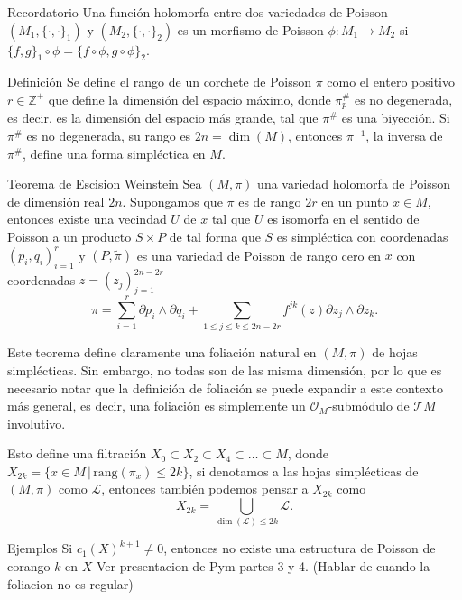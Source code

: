 \documentclass[letterpaper]{beamer}
\newcommand{\zah}{\ensuremath{ \mathbb Z }}
\begin{document}
\begin{frame}
    \begin{block}{Recordatorio}
        Una funci\'on holomorfa entre dos variedades de Poisson $(M_1,\{\cdot,\cdot\}_1)$ y $(M_2,\{\cdot,\cdot\}_2)$ es un morfismo de Poisson
        $\phi:M_1\rightarrow M_2$ si $\{f,g\}_1\circ\phi=\{f\circ\phi,g\circ\phi\}_2$.
    \end{block}
    \begin{block}{Definici\'on}
      Se define el rango de un corchete de Poisson $\pi$ como el entero positivo $r\in \zah^{+}$ que define la dimensi\'on del
      espacio m\'aximo, donde $\pi^{\#}_p$ es no degenerada, es decir, es la dimensi\'on del espacio m\'as grande, tal que $\pi^{\#}$ es una
      biyecci\'on. Si $\pi^{\#}$ es no degenerada, su rango es $2n=\dim(M)$, entonces $\pi^{-1}$, la inversa de $\pi^{\#}$, define una forma simpl\'ectica
      en $M$.
    \end{block}
\end{frame}

\begin{frame}
\begin{block}{Teorema de Escision Weinstein}\label{weins}
        Sea $(M,\pi)$ una variedad holomorfa de Poisson de dimensi\'on real $2n$. Supongamos que $\pi$ es de rango $2r$ en un punto $x\in M$,
        entonces existe una vecindad $U$ de $x$ tal que $U$ es isomorfa en el sentido de Poisson a un producto $S\times P$ de tal forma que $S$ es
        simpl\'ectica con coordenadas $(p_i,q_i)_{i=1}^r$ y $(P,\tilde{\pi})$ es una variedad de Poisson de rango cero en $x$
        con coordenadas $z=(z_j)_{j=1}^{2n-2r}$
        \[
                \pi=\sum_{i=1}^r \partial{p_i}\wedge\partial{q_i}+\sum_{1\leq j\leq k\leq 2n-2r} f^{jk}(z)\partial{z_j}\wedge\partial{z_k}.
        \]
      \end{block}
\end{frame}
\begin{frame} Este teorema define claramente una foliaci\'on natural en $(M,\pi)$ de hojas
simpl\'ecticas. Sin embargo, no todas son de las misma dimensi\'on, por lo que es necesario notar que la definici\'on de foliaci\'on
se puede expandir a este contexto m\'as general, es decir, una foliaci\'on es simplemente un $\mathcal{O}_M$-subm\'odulo de $\mathcal{T}M$ involutivo.
\begin{block}{Esto define una filtraci\'on}
 $X_0\subset X_2\subset X_4\subset\dots\subset M$, donde $X_{2k}=\{x\in M\,|\,\textrm{rang}(\pi_x)\leq 2k\}$,
si denotamos a las hojas simpl\'ecticas de $(M,\pi)$ como $\mathcal{L}$, entonces tambi\'en podemos pensar a $X_{2k}$ como
$$
X_{2k}=\bigcup_{\dim(\mathcal{L})\leq 2k}\mathcal{L}.
$$
\end{block}
\end{frame}
\begin{frame}
  \begin{block}{Ejemplos}
    Si $c_{1}(X)^{k+1}\neq0$, entonces no existe una estructura de Poisson de corango $k$ en $X$
    Ver presentacion de Pym partes 3 y 4. (Hablar de cuando la foliacion no es regular)
  \end{block}
\end{frame}
\end{document}
